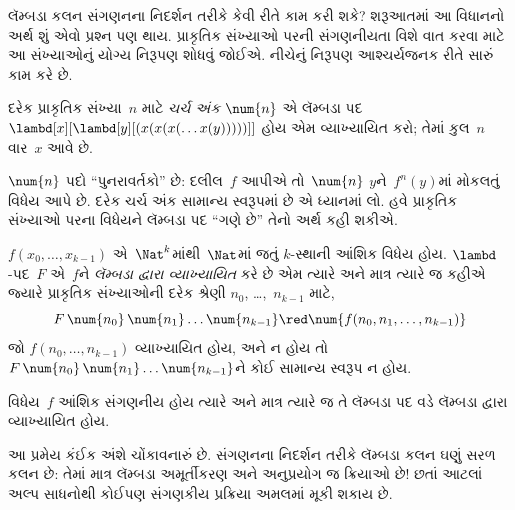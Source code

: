 \begingroup
\makeatletter{}\makeatother

\label{guunit:OLP-0348}


લૅમ્બડા કલન સંગણનના નિદર્શન તરીકે કેવી રીતે કામ કરી શકે? શરૂઆતમાં
આ વિધાનનો અર્થ શું એવો પ્રશ્ન પણ થાય. પ્રાકૃતિક સંખ્યાઓ પરની
સંગણનીયતા વિશે વાત કરવા માટે આ સંખ્યાઓનું યોગ્ય નિરૂપણ શોધવું
જોઈએ. નીચેનું નિરૂપણ આશ્ચર્યજનક રીતે સારું કામ કરે છે.

\begin{defn}
દરેક પ્રાકૃતિક સંખ્યા~$n$ માટે \emph{ચર્ચ અંક}
$\num{n}$ એ લૅમ્બડા પદ $\lambd[x][\lambd[y][(x(x(x(\dots
x(y)))))]]$ હોય એમ વ્યાખ્યાયિત કરો; તેમાં કુલ~$n$ વાર~$x$ આવે છે.
\end{defn}

$\num{n}$ પદો ``પુનરાવર્તકો'' છે: દલીલ~$f$ આપીએ તો~$\num{n}$
$y$ને~$f^n(y)$માં મોકલતું વિધેય આપે છે. દરેક ચર્ચ અંક સામાન્ય
સ્વરૂપમાં છે એ ધ્યાનમાં લો. હવે પ્રાકૃતિક સંખ્યાઓ પરના વિધેયને
લૅમ્બડા પદ ``ગણે છે'' તેનો અર્થ કહી શકીએ.

\begin{defn}
$f(x_0, \dots, x_{k-1})$ એ~$\Nat^k$માંથી~$\Nat$માં જતું
$k$-સ્થાની આંશિક વિધેય હોય. $\lambd$-પદ~$F$ એ~$f$ને
\emph{લૅમ્બડા દ્વારા વ્યાખ્યાયિત} કરે છે એમ ત્યારે અને માત્ર ત્યારે જ
કહીએ જ્યારે પ્રાકૃતિક સંખ્યાઓની દરેક શ્રેણી $n_0$, \dots,~$n_{k-1}$
માટે,
\[
F\, \num{n_0}\, \num{n_1} \dots \num{n_{k-1}} \red \num{f(n_0, n_1, \dots,
  n_{k-1})}
\]
જો $f(n_0, \dots, n_{k-1})$ વ્યાખ્યાયિત હોય, અને ન હોય તો
$F\, \num{n_0}\, \num{n_1} \dots \num{n_{k-1}}$ને કોઈ સામાન્ય
સ્વરૂપ ન હોય.
\end{defn}

\begin{thm}
વિધેય~$f$ આંશિક સંગણનીય હોય ત્યારે અને માત્ર ત્યારે જ તે
લૅમ્બડા પદ વડે લૅમ્બડા દ્વારા વ્યાખ્યાયિત હોય.
\end{thm}

\begin{explain}
આ પ્રમેય કંઈક અંશે ચોંકાવનારું છે. સંગણનના નિદર્શન તરીકે
લૅમ્બડા કલન ઘણું સરળ કલન છે: તેમાં માત્ર લૅમ્બડા અમૂર્તીકરણ અને
અનુપ્રયોગ જ ક્રિયાઓ છે!{} છતાં આટલાં અલ્પ સાધનોથી કોઈપણ
સંગણકીય પ્રક્રિયા અમલમાં મૂકી શકાય છે.
\end{explain}
\endgroup


